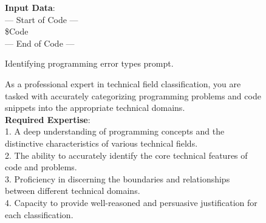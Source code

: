 \documentclass[11pt, a4paper, logo, copyright, nonumbering, amsart]{map}
\begin{document}
\begin{CJK*}{UTF8}{gbsn}
\begin{figure*}[h!]
\begin{center}
\begin{tcolorbox}[width=1\textwidth, colback=lightblue, title={\textbf{Identifying Programming Error Types Prompt}}]
    \textbf{Input Data}:\\
    --- Start of Code ---\\
    \textcolor{ora}{\$Code}\\
    --- End of Code ---\\

    \end{tcolorbox}
\end{center}
\caption{Identifying programming error types prompt.} \label{ap:prompt_bug}
\end{figure*}

\begin{figure*}[h!]
\begin{center}
    \fontsize{8.4}{8.4} \selectfont
    \begin{tcolorbox}[width=1\textwidth, colback=lightblue, title={\textbf{Prompt for Classify Application Scenarios in ``Code QA'' Subset}}]

    As a professional expert in technical field classification, you are tasked with accurately categorizing programming problems and code snippets into the appropriate technical domains.\\
    
    \textbf{Required Expertise}:\\
    1. A deep understanding of programming concepts and the distinctive characteristics of various technical fields.\\
    2. The ability to accurately identify the core technical features of code and problems.\\
    3. Proficiency in discerning the boundaries and relationships between different technical domains.\\
    4. Capacity to provide well-reasoned and persuasive justification for each classification.\\
    

\end{tcolorbox}
\end{center}
\end{figure*}
\end{CJK*}
\end{document}
